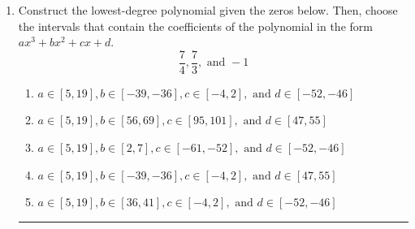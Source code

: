 \documentclass[14pt]{extbook}
\newcommand{\litem}[1]{\item#1\hspace*{-1cm}\rule{\textwidth}{0.4pt}}
\begin{document}
\begin{enumerate}
{\begin{enumerate}[label=\Alph*.]
\end{enumerate} }
\litem{
Construct the lowest-degree polynomial given the zeros below. Then, choose the intervals that contain the coefficients of the polynomial in the form $ax^3+bx^2+cx+d$.\[ \frac{7}{4}, \frac{7}{3}, \text{ and } -1 \]\begin{enumerate}[label=\Alph*.]
\item \( a \in [5, 19], b \in [-39, -36], c \in [-4, 2], \text{ and } d \in [-52, -46] \)
\item \( a \in [5, 19], b \in [56, 69], c \in [95, 101], \text{ and } d \in [47, 55] \)
\item \( a \in [5, 19], b \in [2, 7], c \in [-61, -52], \text{ and } d \in [-52, -46] \)
\item \( a \in [5, 19], b \in [-39, -36], c \in [-4, 2], \text{ and } d \in [47, 55] \)
\item \( a \in [5, 19], b \in [36, 41], c \in [-4, 2], \text{ and } d \in [-52, -46] \)


\end{enumerate}}
\end{enumerate}
\end{document}
